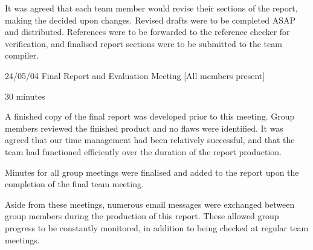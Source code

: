 It was agreed that each team member would revise their sections of the report,
making the decided upon changes. Revised drafts were to be completed ASAP and
distributed. References were to be forwarded to the reference checker for
verification, and finalised report sections were to be submitted to the team
compiler. 

\item{24/05/04} Final Report and Evaluation Meeting
[All members present]

 30 minutes

A finished copy of the final report was developed prior to this meeting. Group
members reviewed the finished product and no flaws were identified. It was
agreed that our time management had been relatively successful, and that the
team had functioned efficiently over the duration of the report production.

Minutes for all group meetings were finalised and added to the report upon the
completion of the final team meeting.

Aside from these meetings, numerous email messages were exchanged between
group members during the production of this report. These allowed group
progress to be constantly monitored, in addition to being checked at regular
team meetings.

